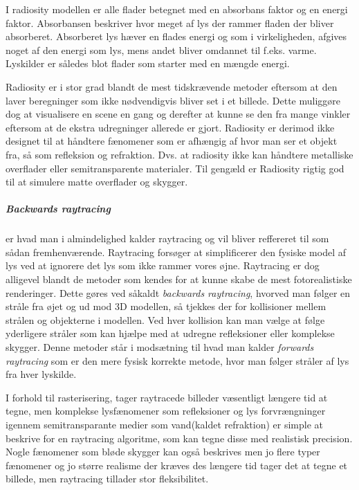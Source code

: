I radiosity modellen er alle flader betegnet med en absorbans faktor og en energi faktor. Absorbansen beskriver hvor meget af lys der rammer fladen der bliver absorberet. Absorberet lys hæver en flades energi og som i virkeligheden, afgives noget af den energi som lys, mens andet bliver omdannet til f.eks. varme. Lyskilder er således blot flader som starter med en mængde energi.

Radiosity er i stor grad blandt de mest tidskrævende metoder eftersom at den laver beregninger som ikke nødvendigvis bliver set i et billede. Dette muliggøre dog at visualisere en scene en gang og derefter at kunne se den fra mange vinkler eftersom at de ekstra udregninger allerede er gjort. Radiosity er derimod ikke designet til at håndtere fænomener som er afhængig af hvor man ser et objekt fra, så som refleksion og refraktion. Dvs. at radiosity ikke kan håndtere metalliske overflader eller semitransparente materialer. Til gengæld er Radiosity rigtig god til at simulere matte overflader og skygger.

\subparagraph{Backwards raytracing} er hvad man i almindelighed kalder raytracing og vil bliver reffereret til som sådan fremhenværende. Raytracing forsøger at simplificerer den fysiske model af lys ved at ignorere det lys som ikke rammer vores øjne. Raytracing er dog alligevel blandt de metoder som kendes for at kunne skabe de mest fotorealistiske renderinger. Dette gøres ved såkaldt \textit{backwards raytracing}, hvorved man følger en stråle fra øjet og ud mod 3D modellen, så tjekkes der for kollisioner mellem strålen og objekterne i modellen. Ved hver kollision kan man vælge at følge yderligere stråler som kan hjælpe med at udregne refleksioner eller komplekse skygger. Denne metoder står i modsætning til hvad man kalder \textit{forwards raytracing} som er den mere fysisk korrekte metode, hvor man følger stråler af lys fra hver lyskilde.

I forhold til rasterisering, tager raytracede billeder væsentligt længere tid at tegne, men komplekse lysfænomener som refleksioner og lys forvrængninger igennem semitransparante medier som vand(kaldet refraktion) er simple at beskrive for en raytracing algoritme, som kan tegne disse med realistisk precision. Nogle fænomener som bløde skygger kan også beskrives men jo flere typer fænomener og jo større realisme der kræves des længere tid tager det at tegne et billede, men raytracing tillader stor fleksibilitet.
